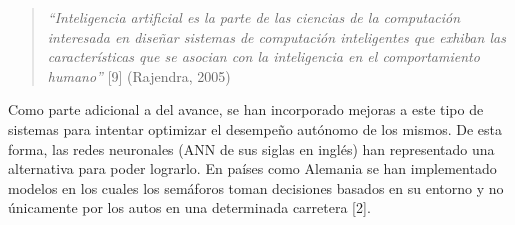 		\begin{quote}
			\textit{``Inteligencia artificial es la parte de las ciencias de
			la computaci\'{o}n interesada en dise\~{n}ar sistemas de computaci\'{o}n inteligentes que exhiban las
			caracter\'{i}sticas que se asocian con la inteligencia en el comportamiento
			humano''} [9] (Rajendra, 2005)
		\end{quote}

		Como parte adicional a del avance, se han incorporado mejoras a este tipo de
	sistemas para intentar optimizar el desempe\~{n}o aut\'{o}nomo de los mismos. De esta
	forma, las redes neuronales (ANN de sus siglas en ingl\'{e}s) han representado una
	alternativa para poder lograrlo. En pa\'{i}ses como Alemania se han implementado
	modelos en los cuales los sem\'{a}foros toman decisiones basados en su entorno y no \'{u}nicamente por los autos en una determinada carretera [2].
